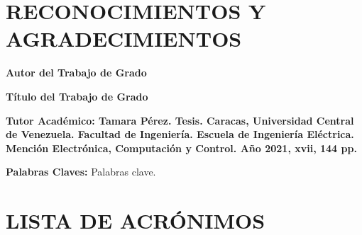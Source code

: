 \documentclass[letterpaper,titlepage,12pt,oneside,spanish,final]{report_eie}
\numberwithin{equation}{chapter}%
\numberwithin{figure}{chapter}%
\numberwithin{table}{chapter}%
\numberwithin{definition}{chapter}%
\numberwithin{lemma}{chapter}%
\numberwithin{theorem}{chapter}%
\numberwithin{corollary}{chapter}%
\numberwithin{condition}{chapter}%
\numberwithin{criterion}{chapter}%
\numberwithin{problem}{chapter}%
\numberwithin{property}{chapter}%
\numberwithin{proposition}{chapter}%
\numberwithin{solution}{chapter}%
\numberwithin{conjecture}{chapter}%
\begin{document}
\chapter*{RECONOCIMIENTOS Y AGRADECIMIENTOS}
%
\newpage
\renewcommand*{\abstract}{\begin{center}\end{center}}
\begin{spacing}{1}
\begin{center}%

\textbf{Autor del Trabajo de Grado}

\begin{large}
\textbf{Título del Trabajo de Grado}
\end{large}
\end{center}

\textbf{Tutor Académico: Tamara Pérez. Tesis.
Caracas, Universidad Central de Venezuela. Facultad de Ingeniería.
Escuela de Ingeniería Eléctrica. Mención Electrónica, Computación y Control. Año 2021,
xvii, 144 pp.}

\textbf{Palabras Claves:} Palabras clave. \\[1ex]


\end{spacing}

%
\thispagestyle{empty}%
\newpage
\addtocounter{page}{3}%
\setlength{\parskip}{3pt}%
\tableofcontents%
\listoffigures%
\listoftables%

\newpage

\chapter*{LISTA DE ACRÓNIMOS}%
%
%

\justifying
\end{document}
